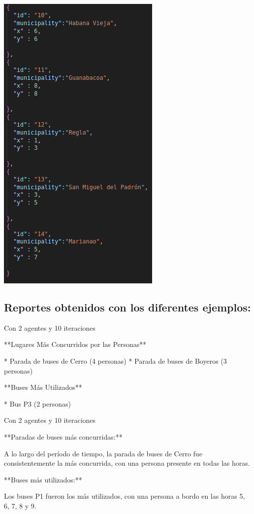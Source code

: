 \documentclass{article}
\begin{document}
\includegraphics{m3.png}

\newpage

\subsection{Reportes obtenidos con los diferentes ejemplos: }

 

Con 2 agentes y 10 iteraciones

**Lugares Más Concurridos por las Personas**

* Parada de buses de Cerro (4 personas)
* Parada de buses de Boyeros (3 personas)

**Buses Más Utilizados**

* Bus P3 (2 personas)

Con 2 agentes y 10 iteraciones

**Paradas de buses más concurridas:**

A lo largo del período de tiempo, la parada de buses de Cerro fue consistentemente la más concurrida, con una persona presente en todas las horas.

**Buses más utilizados:**

Los buses P1 fueron los más utilizados, con una persona a bordo en las horas 5, 6, 7, 8 y 9.
\end{document}
